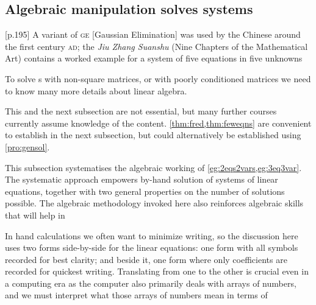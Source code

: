 







\subsection{Algebraic manipulation solves systems}
\label{sec:amss}

\begin{quoted}{\cite{Higham1996} [p.195]}
A variant of \textsc{ge} [Gaussian Elimination] was used by the Chinese around the first century \textsc{ad}; the \emph{Jiu Zhang Suanshu} (Nine Chapters of the Mathematical Art) contains a worked example for a system of five equations in five unknowns
\end{quoted}

To solve s with non-square matrices, or with poorly conditioned matrices we need to know many more details about linear algebra.

This and the next subsection are not essential, but many further courses currently assume knowledge of the content. 
\cref{thm:fred,thm:feweqns} are convenient to establish in the next subsection, but could alternatively be established using \cref{pro:gensol}. 

This subsection systematises the algebraic working of \cref{eg:2eqs2vars,eg:3eq3var}.
The systematic approach empowers by-hand solution of systems of linear equations, together with two general properties on the number of solutions possible.
The algebraic methodology invoked here also reinforces algebraic skills that will help in 

In hand calculations we often want to minimize writing, so the discussion here uses two forms side-by-side for the linear equations: one form with all symbols recorded for best clarity; and beside it, one form where only coefficients are recorded for quickest writing.
Translating from one to the other is crucial even in a computing era as the computer also primarily deals with arrays of numbers, and we must interpret what those arrays of numbers mean in terms of 

